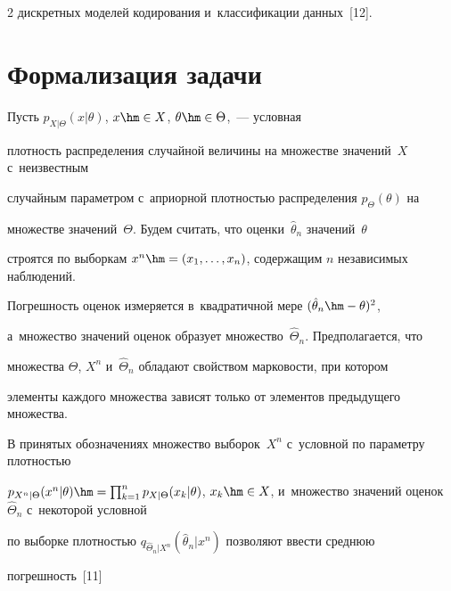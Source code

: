 \begin{multicols}{2}
дискретных моделей кодирования и~классификации данных~[12].





\section{Формализация задачи}





Пусть $p_{X\vert\Theta} (x\vert\theta)$, $x\hm\in X$, $\theta\hm\in \Theta$,~--- условная 


плотность распределения случайной величины на множестве значений~$X$ с~неизвестным 


случайным па\-ра\-мет\-ром с~априорной плот\-ностью распределения $p_\Theta(\theta)$  на 


множестве значений~$\Theta$. Будем считать, что оценки~$\hat{\theta}_n$ значений~$\theta$ 


строятся по выборкам $x^n\hm= (x_1, \ldots , x_n)$, содержащим $n$ независимых наблюдений. 


Погрешность оценок измеряется в~квад\-ра\-тич\-ной мере $(\hat{\theta}_n\hm-\theta)^2$, 


а~множество значений оценок образует множество~$\hat{\Theta}_n$. Предполагается, что 


множества $\Theta$, $X^n$ и~$\hat{\Theta}_n$ обладают свойством марковости, при котором 


элементы каждого множества зависят только от элементов предыду\-ще\-го множества. 





В принятых обозначениях множество выборок~$X^n$ с~условной по па\-ра\-мет\-ру плот\-ностью 


$p_{X^n\vert\Theta} (x^n\vert\theta)\hm= \prod\nolimits^n_{k=1} p_{X\vert\Theta}(x_k\vert 


\theta)$, $x_k\hm\in X$, и~множество значений оценок~$\hat{\Theta}_n$ с~некоторой условной 


по выборке плот\-ностью $q_{\hat{\Theta}_n\vert X^n}(\hat{\theta}_n\vert x^n)$ поз\-во\-ля\-ют ввести сред\-нюю 


по\-греш\-ность~[11] 





\noindent


\begin{multline}



\end{multline}
\end{multicols}
